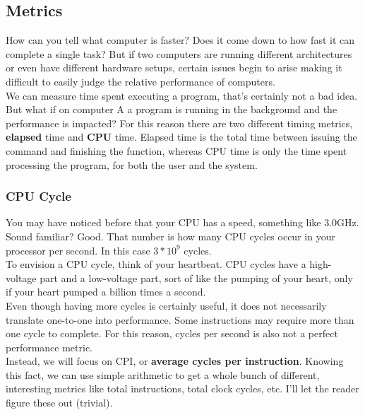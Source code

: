 \documentclass[12pt, twoside, exarticle]{article}
\begin{document}
\subsection{Metrics}

How can you tell what computer is faster?  Does it come down to how fast it can complete a single task?  But if two computers are running different architectures or even have different hardware setups, certain issues begin to arise making it difficult to easily judge the relative performance of computers. \\

We can measure time spent executing a program, that's certainly not a bad idea.  But what if on computer A a program is running in the background and the performance is impacted?  For this reason there are two different timing metrics, \textbf{elapsed} time and \textbf{CPU} time.  Elapsed time is the total time between issuing the command and finishing the function, whereas CPU time is only the time spent processing the program, for both the user and the system. \\

\subsubsection{CPU Cycle}

You may have noticed before that your CPU has a speed, something like 3.0GHz.  Sound familiar?  Good.  That number is how many CPU cycles occur in your processor per second.  In this case $3 * 10^9$ cycles. \\

To envision a CPU cycle, think of your heartbeat.  CPU cycles have a high-voltage part and a low-voltage part, sort of like the pumping of your heart, only if your heart pumped a billion times a second. \\

Even though having more cycles is certainly useful, it does not necessarily translate one-to-one into performance.  Some instructions may require more than one cycle to complete. For this reason, cycles per second is also not a perfect performance metric. \\

Instead, we will focus on CPI, or \textbf{average cycles per instruction}.  Knowing this fact, we can use simple arithmetic to get a whole bunch of different, interesting metrics like total instructions, total clock cycles, etc.  I'll let the reader figure these out (trivial). \\
\end{document}
